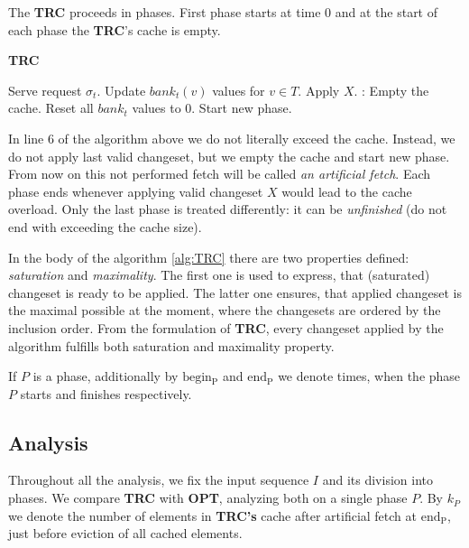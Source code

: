 The \textbf{TRC} proceeds in phases. First phase starts at time 0 and at the
start of each phase the \textbf{TRC}'s cache is empty.  \begin{algorithm}
\caption{\textbf{TRC}} \label{alg:TRC} \begin{algorithmic}[1]  \State Serve request $\sigma_t$.  \State Update $bank_t(v)$
values for $v \in T$.   \State Apply $X$.  : \State Empty the cache.  \State Reset all $bank_t$ values to 0.
\State Start new phase.  \EndIf \EndIf \EndFor \end{algorithmic} \end{algorithm}

In line 6 of the algorithm above we do not literally exceed the cache. Instead,
we do not apply last valid changeset, but we empty the cache and start new
phase. From now on this not performed fetch will be called \textit{an artificial
fetch}.  Each phase ends whenever applying valid changeset $X$ would lead to the
cache overload. Only the last phase is treated differently: it can be
\textit{unfinished} (do not end with exceeding the cache size). 

In the body of the algorithm \ref{alg:TRC} there are two properties defined:
\textit{saturation} and \textit{maximality}. The first one is used to express,
that (saturated) changeset is ready to be applied. The latter one ensures, that
applied changeset is the maximal possible at the moment, where the changesets
are ordered by the inclusion order. From the formulation of \textbf{TRC}, every
changeset applied by the algorithm fulfills both saturation and maximality
property.

If $P$ is a phase, additionally by $\mathrm{begin_P}$ and $\mathrm{end_P}$ we
denote times, when the phase $P$ starts and finishes respectively.

\subsection{Analysis} Throughout all the analysis, we fix the input sequence $I$
and its division into phases. We compare \textbf{TRC} with \textbf{OPT},
analyzing both on a single phase $P$. By $k_P$ we denote the number of elements
in \textbf{TRC's} cache after artificial fetch at $\mathrm{end_P}$, just before
eviction of all cached elements.

